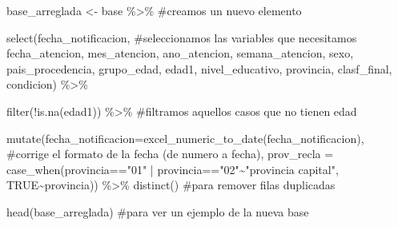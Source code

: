 \documentclass[
  letterpaper,
  DIV=11,
  numbers=noendperiod]{scrreprt}
\newenvironment{Shaded}{\begin{snugshade}}{\end{snugshade}}
\newcommand{\AttributeTok}[1]{\textcolor[rgb]{0.40,0.45,0.13}{#1}}
\newcommand{\CommentTok}[1]{\textcolor[rgb]{0.37,0.37,0.37}{#1}}
\newcommand{\ConstantTok}[1]{\textcolor[rgb]{0.56,0.35,0.01}{#1}}
\newcommand{\FunctionTok}[1]{\textcolor[rgb]{0.28,0.35,0.67}{#1}}
\newcommand{\NormalTok}[1]{\textcolor[rgb]{0.00,0.23,0.31}{#1}}
\newcommand{\OtherTok}[1]{\textcolor[rgb]{0.00,0.23,0.31}{#1}}
\newcommand{\SpecialCharTok}[1]{\textcolor[rgb]{0.37,0.37,0.37}{#1}}
\newcommand{\StringTok}[1]{\textcolor[rgb]{0.13,0.47,0.30}{#1}}
\begin{document}
\begin{Shaded}
\begin{Highlighting}[]
\NormalTok{base\_arreglada }\OtherTok{\textless{}{-}}\NormalTok{ base }\SpecialCharTok{\%\textgreater{}\%} \CommentTok{\#creamos un nuevo elemento}

  \FunctionTok{select}\NormalTok{(fecha\_notificacion, }\CommentTok{\#seleccionamos las variables que necesitamos}
\NormalTok{         fecha\_atencion,}
\NormalTok{         mes\_atencion,}
\NormalTok{         ano\_atencion,}
\NormalTok{         semana\_atencion,}
\NormalTok{         sexo,}
\NormalTok{         pais\_procedencia,}
\NormalTok{         grupo\_edad,}
\NormalTok{         edad1,}
\NormalTok{         nivel\_educativo,}
\NormalTok{         provincia,}
\NormalTok{         clasf\_final,}
\NormalTok{         condicion) }\SpecialCharTok{\%\textgreater{}\%} 
  
  \FunctionTok{filter}\NormalTok{(}\SpecialCharTok{!}\FunctionTok{is.na}\NormalTok{(edad1)) }\SpecialCharTok{\%\textgreater{}\%}  \CommentTok{\#filtramos aquellos casos que no tienen edad}
  
  \FunctionTok{mutate}\NormalTok{(}\AttributeTok{fecha\_notificacion=}\FunctionTok{excel\_numeric\_to\_date}\NormalTok{(fecha\_notificacion), }\CommentTok{\#corrige el formato de la fecha (de numero a fecha),}
   \AttributeTok{prov\_recla =} \FunctionTok{case\_when}\NormalTok{(provincia}\SpecialCharTok{==}\StringTok{"01"} \SpecialCharTok{|}\NormalTok{ provincia}\SpecialCharTok{==}\StringTok{"02"}\SpecialCharTok{\textasciitilde{}}\StringTok{"provincia capital"}\NormalTok{,}
                          \ConstantTok{TRUE}\SpecialCharTok{\textasciitilde{}}\NormalTok{provincia)) }\SpecialCharTok{\%\textgreater{}\%} 
  \FunctionTok{distinct}\NormalTok{() }\CommentTok{\#para remover filas duplicadas}
  
  \FunctionTok{head}\NormalTok{(base\_arreglada) }\CommentTok{\#para ver un ejemplo de la nueva base}
\end{Highlighting}
\end{Shaded}
\end{document}
